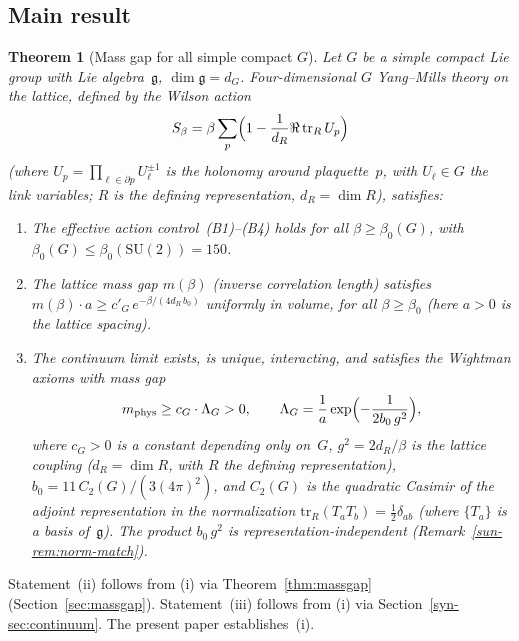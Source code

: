 \documentclass[11pt]{article}
\newtheorem{theorem}{Theorem}[section]
\theoremstyle{definition}
\newcommand{\SU}{\mathrm{SU}}
\newcommand{\tr}{\mathrm{tr}}
\newcommand{\fg}{\mathfrak{g}}
\begin{document}
\subsection{Main result}

\begin{theorem}[Mass gap for all simple compact $G$]
\label{sun-thm:main}
Let $G$ be a simple compact Lie group with Lie
algebra~$\fg$, $\dim\fg=d_G$.  Four-dimensional $G$
Yang--Mills theory on the lattice, defined by the Wilson
action
\begin{equation}\label{sun-eq:wilson}
S_\beta=\beta\sum_p\Bigl(1-\frac{1}{d_R}\Re\,\tr_R\,U_p\Bigr)
\end{equation}
(where $U_p=\prod_{\ell\in\partial p}U_\ell^{\pm 1}$ is the
holonomy around plaquette~$p$, with $U_\ell\in G$ the
link variables; $R$ is the defining representation,
$d_R=\dim R$), satisfies:
\begin{enumerate}[nosep,label=(\roman*)]
\item The effective action control~\textup{(B1)--(B4)}
holds for all $\beta\ge\beta_0(G)$, with
$\beta_0(G)\le\beta_0(\SU(2))=150$.
\item The lattice mass gap $m(\beta)$
(inverse correlation length) satisfies
$m(\beta)\cdot a\ge c'_G\,e^{-\beta/(4d_R\,b_0)}$ uniformly
in volume, for all $\beta\ge\beta_0$
(here $a>0$ is the lattice spacing).
\item The continuum limit exists, is unique, interacting,
and satisfies the Wightman axioms with mass gap
\begin{equation}\label{sun-eq:massgap}
m_{\mathrm{phys}}\ge c_G\cdot\Lambda_G>0,\qquad
\Lambda_G=\frac{1}{a}\exp\Bigl(-\frac{1}{2b_0\,g^2}\Bigr),
\end{equation}
where $c_G>0$ is a constant depending only on~$G$, $g^2=2d_R/\beta$ is the lattice coupling
($d_R=\dim R$, with $R$ the defining representation),
$b_0=11\,C_2(G)/(3(4\pi)^2)$, and $C_2(G)$ is the
quadratic Casimir of the adjoint representation
in the normalization $\tr_R(T_a T_b)=\frac{1}{2}\delta_{ab}$
(where $\{T_a\}$ is a basis of~$\fg$).
The product $b_0\,g^2$ is representation-independent
(Remark~\ref{sun-rem:norm-match}).
\end{enumerate}
\end{theorem}

Statement~(ii) follows from (i) via Theorem~\ref{thm:massgap}
(Section~\ref{sec:massgap}).  Statement~(iii) follows from (i) via
Section~\ref{syn-sec:continuum}.  The present paper
establishes~(i).
\end{document}
